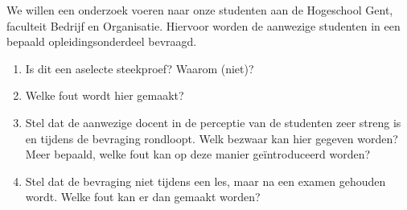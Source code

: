 \begin{exercise}
  We willen een onderzoek voeren naar onze studenten aan de Hogeschool Gent, faculteit Bedrijf en Organisatie. Hiervoor worden de aanwezige studenten in een bepaald opleidingsonderdeel bevraagd.
  
  \begin{enumerate}[label=\alph*.]
    \item Is dit een aselecte steekproef? Waarom (niet)?
    \item Welke fout wordt hier gemaakt?
    \item Stel dat de aanwezige docent in de perceptie van de studenten zeer streng is en tijdens de bevraging rondloopt. Welk bezwaar kan hier gegeven worden? Meer bepaald, welke fout kan op deze manier ge\"introduceerd worden?
    \item Stel dat de bevraging niet tijdens een les, maar na een examen gehouden wordt. Welke fout kan er dan gemaakt worden?
  \end{enumerate}
\end{exercise}

